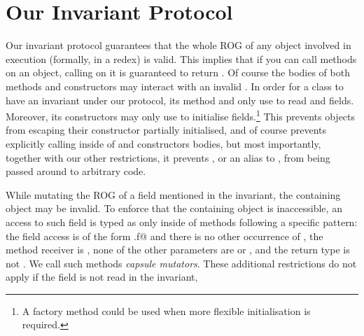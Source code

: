 \saveSpace
\section{Our Invariant Protocol}
\label{s:validate}
\saveSpace
Our invariant protocol guarantees that the whole ROG of any object involved in execution (formally, in a redex) is valid.
This implies that if you can call methods on an object, calling \Q@invariant@ on it is guaranteed to return \Q@true@.
Of course the bodies of both \Q@invariant@ methods and constructors may interact with an invalid \Q@this@.
In order for a class to have an invariant under our protocol,
its \Q@invariant@ method 
and only use \Q@this@ to read \Q@imm@ and \Q@capsule@ fields.
Moreover, its constructors may only use \Q@this@ to initialise fields.\footnote{A factory method could be used when more flexible initialisation is required.} This prevents objects from escaping their constructor partially initialised, and of course prevents explicitly calling \Q@invariant@ inside of \Q@invariants@ and constructors bodies, but most importantly, together with our other restrictions, it prevents \Q@this@, or an alias to \Q@this@, from being passed around to arbitrary code.

While mutating the ROG of a \Q@capsule@ field mentioned in the invariant, the containing object may be invalid.
To enforce that the containing object is inaccessible, an access to such field is typed as \Q@mut@ only inside of methods following a specific pattern: the field access is of the form \Q@this.f@ and there is no other occurrence of \Q@this@, the method receiver is \Q@mut@, none of the other parameters are \Q@mut@ or \Q@read@, and the return type is not \Q@mut@.
We call such methods \emph{capsule mutators}. These additional restrictions do not apply if the field is not read in the invariant,

